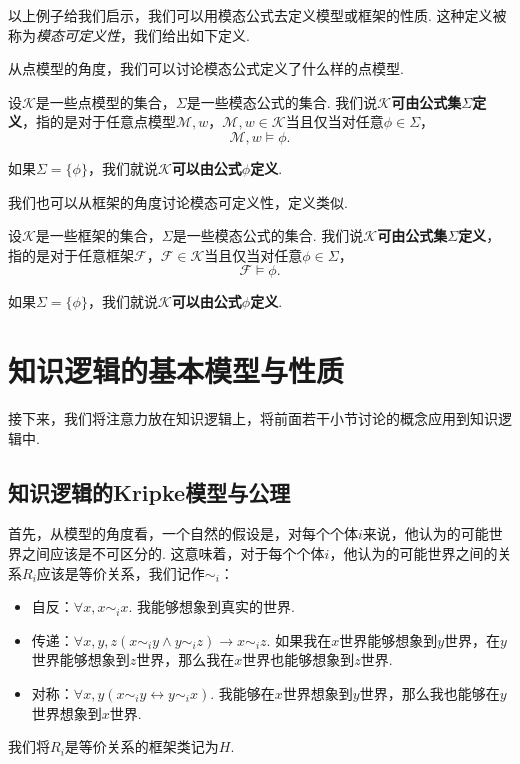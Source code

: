以上例子给我们启示，我们可以用模态公式去定义模型或框架的性质. 这种定义被称为\emph{模态可定义性}，我们给出如下定义. 

从点模型的角度，我们可以讨论模态公式定义了什么样的点模型. 

\begin{definition}[点模型可定义性]
设$\mathcal{K}$是一些点模型的集合，$\Sigma$是一些模态公式的集合. 我们说\textbf{$\mathcal{K}$可由公式集$\Sigma$定义}，指的是对于任意点模型$\mathcal{M}, w$，$\mathcal{M}, w \in \mathcal{K}$当且仅当对任意$\phi\in\Sigma$，
\[ \mathcal{M}, w \vDash \phi. \]

如果$\Sigma = \{\phi\}$，我们就说\textbf{$\mathcal{K}$可以由公式$\phi$定义}. 
\end{definition}

我们也可以从框架的角度讨论模态可定义性，定义类似. 

\begin{definition}[框架可定义性]
设$\mathcal{K}$是一些框架的集合，$\Sigma$是一些模态公式的集合. 我们说\textbf{$\mathcal{K}$可由公式集$\Sigma$定义}，指的是对于任意框架$\mathcal{F}$，$\mathcal{F} \in \mathcal{K}$当且仅当对任意$\phi\in\Sigma$，
\[ \mathcal{F} \vDash \phi. \]

如果$\Sigma = \{\phi\}$，我们就说\textbf{$\mathcal{K}$可以由公式$\phi$定义}. 
\end{definition}

\section{知识逻辑的基本模型与性质}\label{sec:epistemic-logic-basic-model}

接下来，我们将注意力放在知识逻辑上，将前面若干小节讨论的概念应用到知识逻辑中. 

\subsection{知识逻辑的Kripke模型与公理}

首先，从模型的角度看，一个自然的假设是，对每个个体$i$来说，他认为的可能世界之间应该是不可区分的. 这意味着，对于每个个体$i$，他认为的可能世界之间的关系$R_i$应该是等价关系，我们记作$\sim_i$：

\begin{itemize}
    \item 自反：$\forall x,x\sim_ix$. 我能够想象到真实的世界. 
    \item 传递：$\forall x,y,z(x\sim_iy\wedge y\sim_iz)\to x\sim_iz$. 如果我在$x$世界能够想象到$y$世界，在$y$世界能够想象到$z$世界，那么我在$x$世界也能够想象到$z$世界. 
    \item 对称：$\forall x,y(x \sim_i y\leftrightarrow y\sim_ix)$. 我能够在$x$世界想象到$y$世界，那么我也能够在$y$世界想象到$x$世界. 
\end{itemize}
我们将$R_i$是等价关系的框架类记为$H$. 

